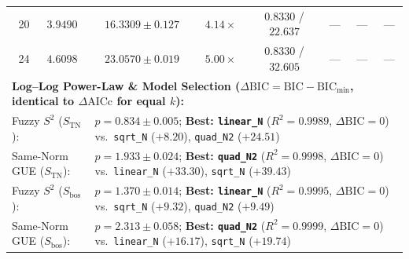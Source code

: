 \documentclass[11pt,a4paper]{article}
\begin{document}
\begin{table}[H]
{\begin{tabular}{@{}rccccccc@{}}
    20 & $3.9490$ & $16.3309 \pm 0.127$ & $4.14\times$ & $0.8330$ / $22.637$ & ---      & ---                & --- \\
    24 & $4.6098$ & $23.0570 \pm 0.019$ & $5.00\times$ & $0.8330$ / $32.605$ & ---      & ---                & --- \\
    \midrule
    \multicolumn{8}{l}{\textbf{Log--Log Power-Law \& Model Selection ($\Delta\mathrm{BIC} = \mathrm{BIC} - \mathrm{BIC}_{\min}$, identical to $\Delta\mathrm{AICc}$ for equal $k$):}} \\
    \multicolumn{2}{l}{Fuzzy $S^2$ ($S_{\mathrm{TN}}$):} & \multicolumn{6}{l}{$p = 0.834 \pm 0.005$;\; \textbf{Best: \texttt{linear\_N}} ($R^2=0.9989$, $\Delta\mathrm{BIC}=0$) vs.\ \texttt{sqrt\_N} ($+8.20$), \texttt{quad\_N2} ($+24.51$)} \\
    \multicolumn{2}{l}{Same-Norm GUE ($S_{\mathrm{TN}}$):} & \multicolumn{6}{l}{$p = 1.933 \pm 0.024$;\; \textbf{Best: \texttt{quad\_N2}} ($R^2=0.9998$, $\Delta\mathrm{BIC}=0$) vs.\ \texttt{linear\_N} ($+33.30$), \texttt{sqrt\_N} ($+39.43$)} \\
    \multicolumn{2}{l}{Fuzzy $S^2$ ($S_{\mathrm{bos}}$):} & \multicolumn{6}{l}{$p = 1.370 \pm 0.014$;\; \textbf{Best: \texttt{linear\_N}} ($R^2=0.9995$, $\Delta\mathrm{BIC}=0$) vs.\ \texttt{sqrt\_N} ($+9.32$), \texttt{quad\_N2} ($+9.49$)} \\
    \multicolumn{2}{l}{Same-Norm GUE ($S_{\mathrm{bos}}$):} & \multicolumn{6}{l}{$p = 2.313 \pm 0.058$;\; \textbf{Best: \texttt{quad\_N2}} ($R^2=0.9999$, $\Delta\mathrm{BIC}=0$) vs.\ \texttt{linear\_N} ($+16.17$), \texttt{sqrt\_N} ($+19.74$)} \\
    \bottomrule
  \end{tabular}%
  }
\end{table}
\end{document}
